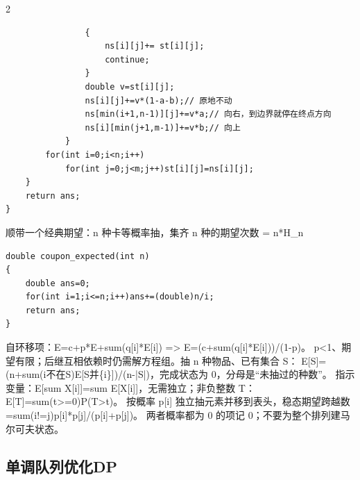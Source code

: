 \documentclass[UTF8,fontset=fandol,a4paper,twoside]{ctexart}
\newcommand{\note}[1]{{\fontsize{10}{12}\selectfont #1\par}}
\begin{document}
\begin{multicols}{2}
\begin{lstlisting}
                {
                    ns[i][j]+= st[i][j];
                    continue;
                }
                double v=st[i][j];
                ns[i][j]+=v*(1-a-b);// 原地不动
                ns[min(i+1,n-1)][j]+=v*a;// 向右，到边界就停在终点方向
                ns[i][min(j+1,m-1)]+=v*b;// 向上
            }
        for(int i=0;i<n;i++)
            for(int j=0;j<m;j++)st[i][j]=ns[i][j];
    }
    return ans;
}
\end{lstlisting}
\note{顺带一个经典期望：n 种卡等概率抽，集齐 n 种的期望次数 =\allowbreak{} n*H\_n}
\begin{lstlisting}
double coupon_expected(int n)
{
    double ans=0;
    for(int i=1;i<=n;i++)ans+=(double)n/i;
    return ans;
}
\end{lstlisting}
\note{自环移项：E=\allowbreak{}c+\allowbreak{}p*E+\allowbreak{}sum(\allowbreak{}q[\allowbreak{}i]\allowbreak{}*E[\allowbreak{}i]\allowbreak{})\allowbreak{} =\allowbreak{}>\allowbreak{} E=\allowbreak{}(\allowbreak{}c+\allowbreak{}sum(\allowbreak{}q[\allowbreak{}i]\allowbreak{}*E[\allowbreak{}i]\allowbreak{})\allowbreak{})\allowbreak{}/\allowbreak{}(\allowbreak{}1-\allowbreak{}p)\allowbreak{}。 p<\allowbreak{}1、期望有限；后继互相依赖时仍需解方程组。抽 n 种物品、已有集合 S： E[\allowbreak{}S]\allowbreak{}=\allowbreak{}(\allowbreak{}n+\allowbreak{}sum(\allowbreak{}i不在S)\allowbreak{}E[\allowbreak{}S并\{i\}]\allowbreak{})\allowbreak{}/\allowbreak{}(\allowbreak{}n-\allowbreak{}|S|)\allowbreak{}，完成状态为 0，分母是“未抽过的种数”。 指示变量：E[\allowbreak{}sum X[\allowbreak{}i]\allowbreak{}]\allowbreak{}=\allowbreak{}sum E[\allowbreak{}X[\allowbreak{}i]\allowbreak{}]\allowbreak{}，无需独立；非负整数 T：E[\allowbreak{}T]\allowbreak{}=\allowbreak{}sum(\allowbreak{}t>\allowbreak{}=\allowbreak{}0)\allowbreak{}P(\allowbreak{}T>\allowbreak{}t)\allowbreak{}。 按概率 p[\allowbreak{}i]\allowbreak{} 独立抽元素并移到表头，稳态期望跨越数=\allowbreak{}sum(\allowbreak{}i!=\allowbreak{}j)\allowbreak{}p[\allowbreak{}i]\allowbreak{}*p[\allowbreak{}j]\allowbreak{}/\allowbreak{}(\allowbreak{}p[\allowbreak{}i]\allowbreak{}+\allowbreak{}p[\allowbreak{}j]\allowbreak{})\allowbreak{}。 两者概率都为 0 的项记 0；不要为整个排列建马尔可夫状态。}
\subsection{单调队列优化DP}


\end{multicols}
\end{document}
